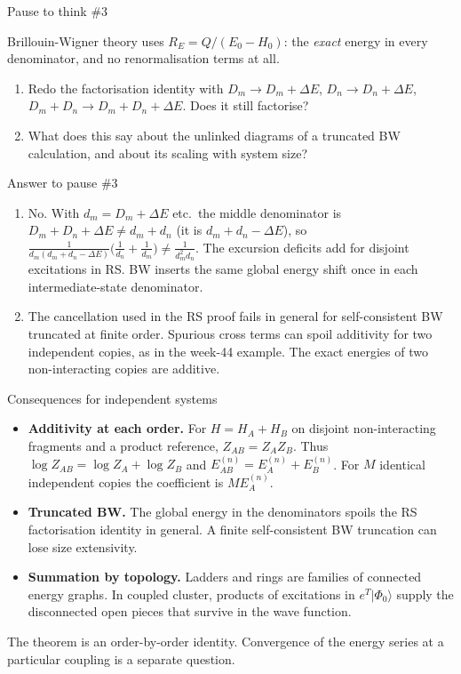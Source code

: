 \documentclass[aspectratio=169,10pt]{beamer}
\newcounter{thinkctr}
\newcommand{\thinkq}[2]{%
  \stepcounter{thinkctr}%
  \vfill
  \begin{tcolorbox}[enhanced,colback=palewarm,colframe=warm,boxrule=1.2pt,arc=4pt,
    grow to left by=6mm,grow to right by=6mm,
    left=16pt,right=16pt,top=16pt,bottom=18pt,
    fonttitle=\bfseries\Large,fontupper=\Large,
    title={Pause to think \#\thethinkctr\hfill\mdseries\normalsize(about #1 min -- discuss with your neighbour)}]
  #2
  \end{tcolorbox}
  \vfill}
\newcommand{\thinka}[1]{%
  \vfill
  \begin{tcolorbox}[enhanced,colback=paleteal,colframe=teal,boxrule=1.2pt,arc=4pt,
    grow to left by=6mm,grow to right by=6mm,
    left=16pt,right=16pt,top=16pt,bottom=18pt,
    fonttitle=\bfseries\Large,fontupper=\large,
    title={Answer to pause \#\thethinkctr}]
  #1
  \end{tcolorbox}
  \vfill}
\newcommand{\ket}[1]{\vert #1\rangle}
\newcommand{\ph}{\Phi_0}
\begin{document}
\begin{frame}{Pause to think \#3}
\thinkq{3}{Brillouin-Wigner theory uses \(R_E=Q/(E_0-H_0)\): the \emph{exact} energy in every denominator, and no renormalisation terms at all.
\begin{enumerate}
\item Redo the factorisation identity with \(D_m\to D_m+\Delta E\), \(D_n\to D_n+\Delta E\), \(D_m+D_n\to D_m+D_n+\Delta E\). Does it still factorise?
\item What does this say about the unlinked diagrams of a truncated BW calculation, and about its scaling with system size?
\end{enumerate}}
\end{frame}

\begin{frame}{Answer to pause \#3}
\thinka{%
\begin{enumerate}
\item No. With \(d_m=D_m+\Delta E\) etc.\ the middle denominator is \(D_m+D_n+\Delta E\ne d_m+d_n\) (it is \(d_m+d_n-\Delta E\)), so \(\frac{1}{d_m(d_m+d_n-\Delta E)}\bigl(\frac1{d_n}+\frac1{d_m}\bigr)\ne\frac1{d_m^2d_n}\). The excursion deficits add for disjoint excitations in RS. BW inserts the same global energy shift once in each intermediate-state denominator.
\item The cancellation used in the RS proof fails in general for self-consistent BW truncated at finite order. Spurious cross terms can spoil additivity for two independent copies, as in the week-44 example. The exact energies of two non-interacting copies are additive.
\end{enumerate}}
\end{frame}

\begin{frame}{Consequences for independent systems}
\begin{itemize}
\item \textbf{Additivity at each order.} For $H=H_A+H_B$ on disjoint non-interacting fragments and a product reference, $Z_{AB}=Z_A Z_B$. Thus $\log Z_{AB}=\log Z_A+\log Z_B$ and $E_{AB}^{(n)}=E_A^{(n)}+E_B^{(n)}$. For $M$ identical independent copies the coefficient is $M E_A^{(n)}$.
\item \textbf{Truncated BW.} The global energy in the denominators spoils the RS factorisation identity in general. A finite self-consistent BW truncation can lose size extensivity.
\item \textbf{Summation by topology.} Ladders and rings are families of connected energy graphs. In coupled cluster, products of excitations in $e^T\ket{\ph}$ supply the disconnected open pieces that survive in the wave function.
\end{itemize}
\small The theorem is an order-by-order identity. Convergence of the energy series at a particular coupling is a separate question.
\end{frame}
\end{document}
